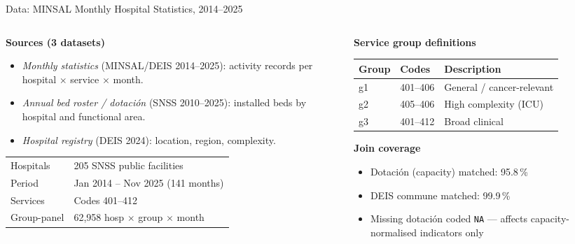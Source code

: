 \documentclass[aspectratio=169]{beamer}
\begin{document}
\begin{frame}{Data: MINSAL Monthly Hospital Statistics, 2014--2025}
  \begin{columns}[T]
    \begin{column}{0.50\textwidth}
      \textbf{Sources (3 datasets)}
      \begin{itemize}\scriptsize\setlength{\itemsep}{2pt}
        \item \emph{Monthly statistics} (MINSAL/DEIS 2014--2025): activity records
              per hospital $\times$ service $\times$ month.
        \item \emph{Annual bed roster / dotaci\'on} (SNSS 2010--2025):
              installed beds by hospital and functional area.
        \item \emph{Hospital registry} (DEIS 2024): location, region, complexity.
      \end{itemize}
      \smallskip
      \begin{center}\scriptsize
        \begin{tabular}{ll}
          \toprule
          Hospitals   & 205 SNSS public facilities \\
          Period      & Jan 2014 -- Nov 2025 (141 months) \\
          Services    & Codes 401--412 \\
          Group-panel & 62{,}958 hosp $\times$ group $\times$ month \\
          \bottomrule
        \end{tabular}
      \end{center}
    \end{column}
    \begin{column}{0.46\textwidth}
      \textbf{Service group definitions}
      \begin{center}\scriptsize
        \begin{tabular}{lll}
          \toprule
          Group & Codes & Description \\
          \midrule
          g1 & 401--406 & General / cancer-relevant \\
          g2 & 405--406 & High complexity (ICU) \\
          g3 & 401--412 & Broad clinical \\
          \bottomrule
        \end{tabular}
      \end{center}
      \smallskip
      \textbf{Join coverage}
      \begin{itemize}\scriptsize\setlength{\itemsep}{2pt}
        \item Dotaci\'on (capacity) matched: 95.8\,\%
        \item DEIS commune matched: 99.9\,\%
        \item Missing dotaci\'on coded \texttt{NA} --- affects capacity-normalised indicators only
      \end{itemize}
    \end{column}
  \end{columns}
\end{frame}
\end{document}
